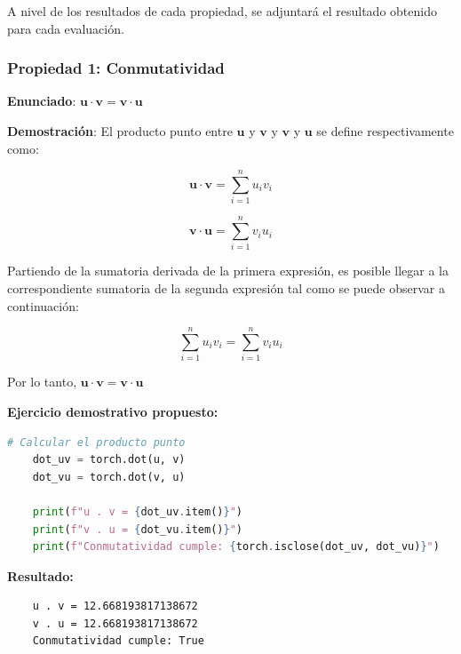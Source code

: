 \documentclass[12 pt]{article}
\begin{document}
A nivel de los resultados de cada propiedad, se adjuntará el resultado obtenido para cada evaluación.


\subsubsection*{Propiedad 1: Conmutatividad}

\begin{center}
\textbf{Enunciado}: \(\mathbf{u} \cdot \mathbf{v} = \mathbf{v} \cdot \mathbf{u}\)\\
\end{center}

\textbf{Demostración}: El producto punto entre \(\mathbf{u}\) y \(\mathbf{v}\) y \(\mathbf{v}\) y \(\mathbf{u}\) se define respectivamente como:

\[
\mathbf{u} \cdot \mathbf{v} = \sum_{i=1}^{n} u_i v_i
\]

\[
\mathbf{v} \cdot \mathbf{u} = \sum_{i=1}^{n} v_i u_i
\]

Partiendo de la sumatoria derivada de la primera expresión, es posible llegar a la correspondiente sumatoria de la segunda expresión tal como se puede observar a continuación:

\[
\sum_{i=1}^{n} u_i v_i = \sum_{i=1}^{n} v_i u_i
\]

\begin{center}
Por lo tanto, \(\mathbf{u} \cdot \mathbf{v} = \mathbf{v} \cdot \mathbf{u}\)\\
\end{center}

\textbf{Ejercicio demostrativo propuesto:}
\begin{lstlisting}[language=Python]
    # Calcular el producto punto
    dot_uv = torch.dot(u, v)
    dot_vu = torch.dot(v, u)
    
    print(f"u . v = {dot_uv.item()}")
    print(f"v . u = {dot_vu.item()}")
    print(f"Conmutatividad cumple: {torch.isclose(dot_uv, dot_vu)}")
\end{lstlisting}

\textbf{Resultado:}
\begin{lstlisting}
    u . v = 12.668193817138672
    v . u = 12.668193817138672
    Conmutatividad cumple: True
\end{lstlisting}

\end{document}

